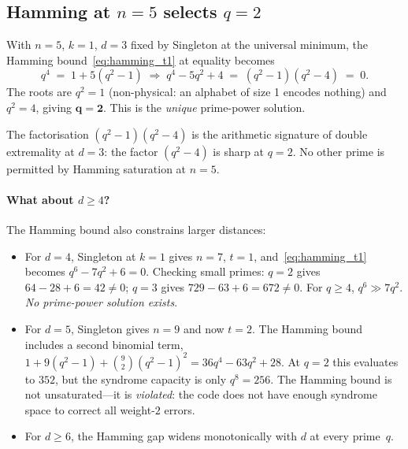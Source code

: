 \documentclass[11pt,a4paper]{article}
\begin{document}
\subsection{Hamming at $n=5$ selects $q=2$}
\label{sec:hamming_select}

With $n=5$, $k=1$, $d=3$ fixed by Singleton at the universal minimum, the Hamming bound~\eqref{eq:hamming_t1} at equality becomes
\begin{equation}
  q^4 \;=\; 1 + 5(q^2-1)
  \;\Longrightarrow\;
  q^4 - 5q^2 + 4 \;=\; (q^2-1)(q^2-4) \;=\; 0.
  \label{eq:factor}
\end{equation}
The roots are $q^2=1$ (non-physical: an alphabet of size 1 encodes nothing) and $q^2=4$, giving $\boldsymbol{q=2}$. This is the \emph{unique} prime-power solution.

The factorisation $(q^2-1)(q^2-4)$ is the arithmetic signature of double extremality at $d=3$: the factor $(q^2-4)$ is sharp at $q=2$. No other prime is permitted by Hamming saturation at $n=5$.

\paragraph{What about $d\geq4$?} The Hamming bound also constrains larger distances:

\begin{itemize}\setlength\itemsep{2pt}
\item For $d=4$, Singleton at $k=1$ gives $n=7$, $t=1$, and~\eqref{eq:hamming_t1} becomes $q^6 - 7q^2 + 6 = 0$. Checking small primes: $q=2$ gives $64-28+6=42\neq0$; $q=3$ gives $729-63+6=672\neq0$. For $q\geq4$, $q^6\gg 7q^2$. \emph{No prime-power solution exists}.
\item For $d=5$, Singleton gives $n=9$ and now $t=2$. The Hamming bound includes a second binomial term, $1+9(q^2-1)+\binom{9}{2}(q^2-1)^2 = 36q^4-63q^2+28$. At $q=2$ this evaluates to $352$, but the syndrome capacity is only $q^8=256$. The Hamming bound is not unsaturated---it is \emph{violated}: the code does not have enough syndrome space to correct all weight-$2$ errors.
\item For $d\geq6$, the Hamming gap widens monotonically with $d$ at every prime~$q$.
\end{itemize}
\end{document}

